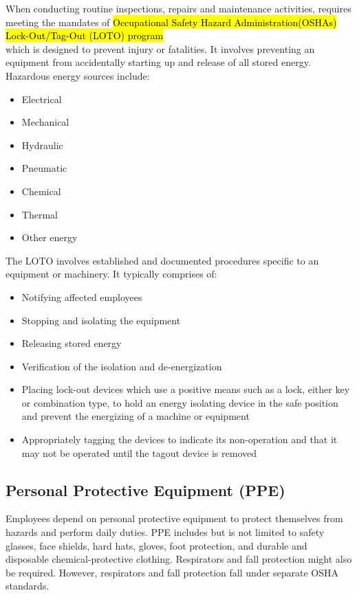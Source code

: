 When conducting routine inspections, repairs and maintenance activities, requires meeting the mandates of \hl{Occupational Safety  Hazard Administration(OSHAs) Lock-Out/Tag-Out (LOTO) program}\\
which is designed to prevent injury or fatalities.  It involves preventing an equipment from accidentally starting up and release of all stored energy.  Hazardous energy sources include: 
\begin{itemize}
\item Electrical 
\item Mechanical
\item Hydraulic
\item Pneumatic 
\item Chemical 
\item Thermal  
\item Other energy
\end{itemize}

The LOTO involves established and documented procedures specific to an equipment or machinery.  It typically comprises of:\\
\begin{itemize}
\item Notifying affected employees
\item Stopping and isolating the equipment
\item Releasing stored energy
\item Verification of the isolation and de-energization
\item Placing lock-out devices which use a positive means such as a lock, either key or combination type, to hold an energy isolating device in the safe position and prevent the energizing of a machine or equipment
\item Appropriately tagging the devices to indicate its non-operation and that it may not be operated until the tagout device is removed
\end{itemize}

\subsection{Personal Protective Equipment (PPE)}
Employees depend on personal protective equipment to protect themselves from hazards and perform daily duties. PPE includes but is not limited to safety glasses, face shields, hard hats, gloves, foot protection, and durable and disposable chemical-protective clothing. Respirators and fall protection might also be required. However, respirators and fall protection fall under separate OSHA standards. \\

